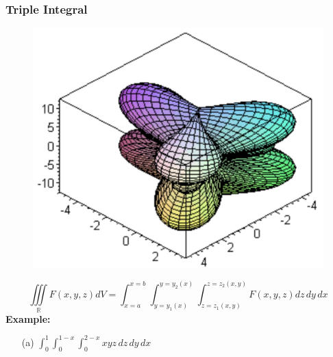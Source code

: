 \documentclass{beamer}
\begin{document}
\begin{frame}
\frametitle{\textbf{Triple Integral}}
\begin{figure}
	\centering
	\includegraphics[height=.45\textheight]{IMG_0384.jpg}\\
	\hspace*{10pt}\hbox{}
\end{figure}

$$\iiint\limits_{\mathbb{R}} F(x,y,z) dV = \int_{x=a}^{x=b} \int_{y=y_1(x)}^{y=y_2(x)} \int_{z=z_1(x,y)}^{z=z_2(x,y)} F(x,y,z) dz\,dy\,dx$$
\textbf{Example:}
\begin{itemize}
	\item[(a)] $\int_0^1 \int_0^{1-x} \int_0^{2-x} xyz \,dz\,dy\,dx$
\end{itemize}
\end{frame}
\end{document}
